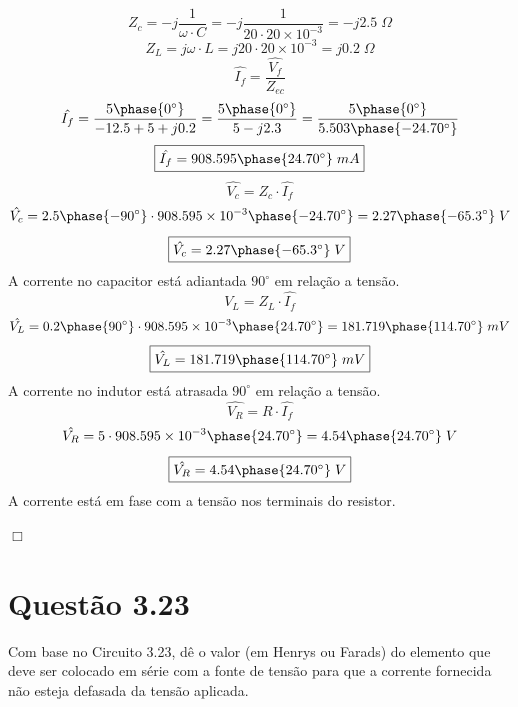 \documentclass[
	12pt,				%
	oneside,			%
	a4paper,			%
	english,			%
	french,				%
	spanish,			%
	brazil				%
	]{abntex2}
\begin{document}
$$Z_c = -j{\dfrac{1}{\omega\cdot C}}=-j{\dfrac{1}{20\cdot 20\times 10^{-3}}}=-j2.5\;\Omega$$
$$Z_L=j\omega \cdot L=j20\cdot20\times10^{-3}=j0.2\;\Omega$$
$$\hat{I_f}={\dfrac{\hat{V_f}}{Z_{ec}}}$$
$$\hat{I_f}={\dfrac{{5 \phase{0^{\circ}}}}{-12.5+5+j0.2}}={\dfrac{{5 \phase{0^{\circ}}}}{5-j2.3}}={\dfrac{{5 \phase{0^{\circ}}}}{{5.503 \phase{-24.70^{\circ}}}}}$$
\begin{equation}
   \fbox{$\hat{I_f}={908.595 \phase{24.70^{\circ}}}\;mA$}
\end{equation}
$$\hat{V_c}=Z_c\cdot \hat{I_f}$$
$$\hat{V_c}={2.5 \phase{-90^{\circ}}}\cdot{908.595\times10^{-3} \phase{-24.70^{\circ}}}={2.27 \phase{-65.3^{\circ}}}\;V$$
\begin{equation}
    \fbox{$\hat{V_c}={2.27 \phase{-65.3^{\circ}}}\;V$}
\end{equation}
A corrente no capacitor está adiantada $90^{\circ}$ em relação a tensão.
$$\hat{V_L}=Z_L\cdot \hat{I_f}$$
$$\hat{V_L}={0.2 \phase{90^{\circ}}}\cdot{908.595\times10^{-3} \phase{24.70^{\circ}}}={181.719 \phase{114.70^{\circ}}}\;mV$$
\begin{equation}
    \fbox{$\hat{V_L}={181.719 \phase{114.70^{\circ}}}\;mV$}
\end{equation}
A corrente no indutor está atrasada $90^{\circ}$ em relação a tensão.
$$\hat{V_R}=R\cdot \hat{I_f}$$
$$\hat{V_R}=5\cdot{908.595\times10^{-3} \phase{24.70^{\circ}}}={4.54 \phase{24.70^{\circ}}}\;V$$
\begin{equation}
    \fbox{$\hat{V_R}={4.54 \phase{24.70^{\circ}}}\;V$}
\end{equation}
A corrente está em fase com a tensão nos terminais do resistor.

\begin{flushright}
    $\Box$
\end{flushright}

\newpage


\section*{Questão 3.23}

Com base no Circuito 3.23, dê o valor (em Henrys ou Farads) do elemento que deve ser colocado em série com a fonte de tensão para que a corrente fornecida não esteja defasada da tensão aplicada.
\end{document}
